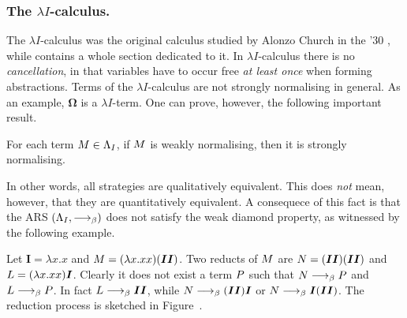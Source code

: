 \subsubsection{The $\lambda I$-calculus.}
The $\lambda I$-calculus was the original calculus studied by Alonzo
Church in the '30 \cite{church_unsolvable_1936}, while
\cite{barendregt_lambda_1984} contains a whole section dedicated to
it. In $\lambda I$-calculus there is no \emph{cancellation}, in that
variables have to occur free \emph{at least once} when forming
abstractions. Terms of the $\lambda I$-calculus are not strongly
normalising in general. As an example, $\bm{\Omega}$ is a $\lambda I$-term.
One can prove, however, the following important result.
\begin{theorem}
	For each term $M\in\Lambda_I$, if $M$ is weakly normalising, then it is strongly normalising.
\end{theorem}
In other words, all strategies are qualitatively equivalent. This does \emph{not} mean, however, that they are quantitatively equivalent. A consequece of this fact is that the ARS $(\Lambda_I,\longrightarrow_\beta)$ does not satisfy the weak diamond property, as witnessed by the following example.
\begin{example}
	Let $\bm{I}=\lambda x.x$ and $M=(\lambda x.xx)(\bm{II})$. Two reducts of $M$ are $N=(\bm{II})(\bm{II})$ and $L=(\lambda x.xx)\bm{I}$. Clearly it does not exist a term $P$ such that $N\longrightarrow_\beta P$ and $L\longrightarrow_\beta P$. In fact $L\longrightarrow_\beta\bm{II}$, while $N\longrightarrow_\beta(\bm{II})\bm{I}$ or $N\longrightarrow_\beta\bm{I}(\bm{II})$. The reduction process is sketched in Figure~.
\end{example}
\begin{figure}
	\begin{center}
	\end{center}
\end{figure}
